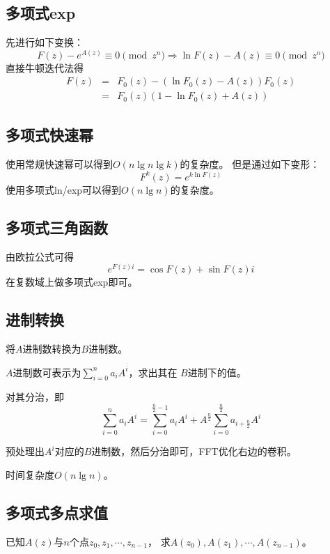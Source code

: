 \subsection{多项式exp}
先进行如下变换：
\begin{displaymath}
    F(z)-e^{A(z)}\equiv 0 \pmod{z^n}
    \Rightarrow \ln F(z)-A(z)\equiv 0 \pmod{z^n}
\end{displaymath}
直接牛顿迭代法得
\begin{eqnarray*}
    F(z)&=&F_0(z)-(\ln F_0(z)-A(z))F_0(z)\\
    &=&F_0(z)(1-\ln F_0(z)+A(z))
\end{eqnarray*}
\subsection{多项式快速幂}
使用常规快速幂可以得到$O(n\lg n\lg k)$的复杂度。
但是通过如下变形：
\begin{displaymath}
    F^k(z)=e^{k \ln F(z)}
\end{displaymath}
使用多项式ln/exp可以得到$O(n\lg n)$的复杂度。
\subsection{多项式三角函数}
由欧拉公式可得
\begin{displaymath}
    e^{F(z)i}=\cos F(z)+\sin F(z) i
\end{displaymath}
在复数域上做多项式exp即可。
\subsection{进制转换}
将$A$进制数转换为$B$进制数。

$A$进制数可表示为$\displaystyle \sum_{i=0}^n{a_iA^i}$，求出其在
$B$进制下的值。

对其分治，即
\begin{displaymath}
    \sum_{i=0}^n{a_iA^i}=\sum_{i=0}^{\frac{n}{2}-1}{a_iA^i}
    +A^{\frac{n}{2}}\sum_{i=0}^{\frac{n}{2}}{a_{i+\frac{n}{2}}A^i}
\end{displaymath}

预处理出$A^i$对应的$B$进制数，然后分治即可，FFT优化右边的卷积。

时间复杂度$O(n \lg n)$。

\subsection{多项式多点求值}
已知$A(z)$与$n$个点$z_0,z_1,\cdots,z_{n-1}$，
求$A(z_0),A(z_1),\cdots,A(z_{n-1})$。

